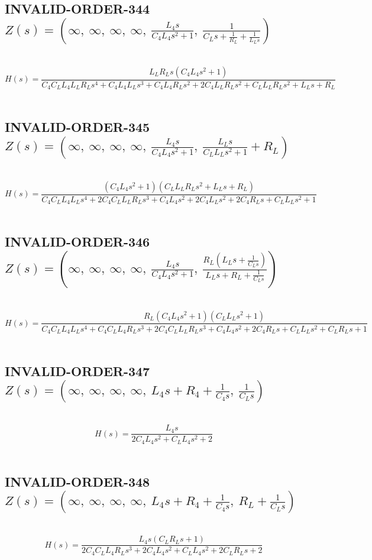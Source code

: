 \documentclass{article}
\begin{document}
\subsection{INVALID-ORDER-344 $Z(s) = \left( \infty, \  \infty, \  \infty, \  \infty, \  \frac{L_{4} s}{C_{4} L_{4} s^{2} + 1}, \  \frac{1}{C_{L} s + \frac{1}{R_{L}} + \frac{1}{L_{L} s}}\right)$ } \ 
\textbf{\[H(s) = \frac{L_{L} R_{L} s \left(C_{4} L_{4} s^{2} + 1\right)}{C_{4} C_{L} L_{4} L_{L} R_{L} s^{4} + C_{4} L_{4} L_{L} s^{3} + C_{4} L_{4} R_{L} s^{2} + 2 C_{4} L_{L} R_{L} s^{2} + C_{L} L_{L} R_{L} s^{2} + L_{L} s + R_{L}}\] } \ 
\subsection{INVALID-ORDER-345 $Z(s) = \left( \infty, \  \infty, \  \infty, \  \infty, \  \frac{L_{4} s}{C_{4} L_{4} s^{2} + 1}, \  \frac{L_{L} s}{C_{L} L_{L} s^{2} + 1} + R_{L}\right)$ } \ 
\textbf{\[H(s) = \frac{\left(C_{4} L_{4} s^{2} + 1\right) \left(C_{L} L_{L} R_{L} s^{2} + L_{L} s + R_{L}\right)}{C_{4} C_{L} L_{4} L_{L} s^{4} + 2 C_{4} C_{L} L_{L} R_{L} s^{3} + C_{4} L_{4} s^{2} + 2 C_{4} L_{L} s^{2} + 2 C_{4} R_{L} s + C_{L} L_{L} s^{2} + 1}\] } \ 
\subsection{INVALID-ORDER-346 $Z(s) = \left( \infty, \  \infty, \  \infty, \  \infty, \  \frac{L_{4} s}{C_{4} L_{4} s^{2} + 1}, \  \frac{R_{L} \left(L_{L} s + \frac{1}{C_{L} s}\right)}{L_{L} s + R_{L} + \frac{1}{C_{L} s}}\right)$ } \ 
\textbf{\[H(s) = \frac{R_{L} \left(C_{4} L_{4} s^{2} + 1\right) \left(C_{L} L_{L} s^{2} + 1\right)}{C_{4} C_{L} L_{4} L_{L} s^{4} + C_{4} C_{L} L_{4} R_{L} s^{3} + 2 C_{4} C_{L} L_{L} R_{L} s^{3} + C_{4} L_{4} s^{2} + 2 C_{4} R_{L} s + C_{L} L_{L} s^{2} + C_{L} R_{L} s + 1}\] } \ 
\subsection{INVALID-ORDER-347 $Z(s) = \left( \infty, \  \infty, \  \infty, \  \infty, \  L_{4} s + R_{4} + \frac{1}{C_{4} s}, \  \frac{1}{C_{L} s}\right)$ } \ 
\textbf{\[H(s) = \frac{L_{4} s}{2 C_{4} L_{4} s^{2} + C_{L} L_{4} s^{2} + 2}\] } \ 
\subsection{INVALID-ORDER-348 $Z(s) = \left( \infty, \  \infty, \  \infty, \  \infty, \  L_{4} s + R_{4} + \frac{1}{C_{4} s}, \  R_{L} + \frac{1}{C_{L} s}\right)$ } \ 
\textbf{\[H(s) = \frac{L_{4} s \left(C_{L} R_{L} s + 1\right)}{2 C_{4} C_{L} L_{4} R_{L} s^{3} + 2 C_{4} L_{4} s^{2} + C_{L} L_{4} s^{2} + 2 C_{L} R_{L} s + 2}\] } \ 
\end{document}
